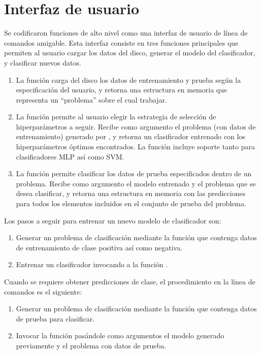 %
%
%
\section{Interfaz de usuario}
%
Se codificaron funciones de alto nivel como una interfaz de usuario
de línea de comandos amigable. Esta interfaz consiste en
tres funciones principales que permiten al usuario cargar los datos del disco,
generar el modelo del clasificador, y clasificar nuevos datos.
%
\begin{enumerate}
\item
  La función  carga del disco los datos de
  entrenamiento y prueba según la especificación del usuario, y
  retorna una estructura en memoria que representa un ``problema''
  sobre el cual trabajar.
\item
  La función  permite al usuario elegir la
  estrategia de selección de hiperparámetros a seguir.
  Recibe como argumento el problema (con datos de entrenamiento)
  generado por , y retorna un clasificador
  entrenado con los hiperparámetros óptimos encontrados.
  La función incluye soporte tanto para clasificadores MLP así como SVM.
\item
  La función  permite clasificar los datos de prueba
  especificados dentro de un problema.
  Recibe como argumento el modelo entrenado y el problema que se desea
  clasificar, y retorna una estructura en memoria con las predicciones
  para todos los elementos incluidos en el conjunto de prueba del
  problema.
\end{enumerate}
%
Los pasos a seguir para entrenar un nuevo modelo de clasificador
son:
%
\begin{enumerate}
\item Generar un problema de clasificación mediante la función
   que contenga datos de entrenamiento de clase
  positiva así como negativa.
\item Entrenar un clasificador invocando a la función
  .
\end{enumerate}
%
Cuando se requiere obtener predicciones de clase, el procedimiento
en la línea de comandos es el siguiente:
%
\begin{enumerate}
\item Generar un problema de clasificación mediante la función
   que contenga datos de prueba para clasificar.
\item Invocar la función  pasándole como argumentos
  el modelo generado previamente y el problema con datos de prueba.
\end{enumerate}
%
